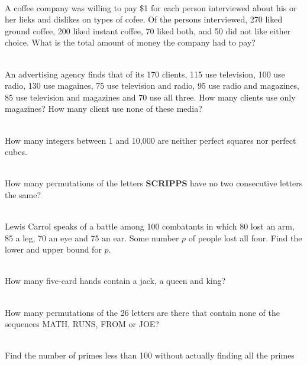 \documentclass[12pt,letterpaper,boxed]{hmcpset}
\begin{document}
\begin{problem}[Shahriari 8.1.1][20]
\\
A coffee company was willing to pay \$1 for each person interviewed about his or her lieks and dislikes on types of cofee. Of the persons interviewed, 270 liked ground coffee, 200 liked instant coffee, 70 liked both, and 50 did not like either choice. What is the total amount of money the company had to pay?
\
\end{problem}
\begin{problem}[Shahriari 8.1.3][20]
\\
An advertising agency finds that of its 170 clients, 115 use television, 100 use radio, 130 use magaines, 75 use television and radio, 95 use radio and magazines, 85 use television and magazines and 70 use all three. How many clients use only magazines? How many client use none of these media?
\
\end{problem}
\begin{problem}[Shahriari 8.1.4][20]
\\
How many integers between 1 and 10,000 are neither perfect squares nor perfect cubes.
\
\end{problem}
\begin{problem}[Shahriari 8.1.6][20]
\\
How many permutations of the letters \textbf{SCRIPPS} have no two consecutive letters the same?
\
\end{problem}
\begin{problem}[Shahriari 8.1.8][20]
\\
Lewis Carrol speaks of a battle among 100 combatants in which 80 lost an arm, 85 a leg, 70 an eye and 75 an ear. Some number $p$ of people lost all four. Find the lower and upper bound for $p$.
\
\end{problem}
\begin{problem}[Shahriari 8.1.10][20]
\\
How many five-card hands contain a jack, a queen and king?
\
\end{problem}
\begin{problem}[Shahriari 8.1.14][20]
\\
How many permutations of the 26 letters are there that contain none of the sequences MATH, RUNS, FROM or JOE?
\
\end{problem}
\begin{problem}[Shahriari 8.1.15][20]
\\
Find the number of primes less than 100 without actually finding all the primes
\
\end{problem}
\end{document}
